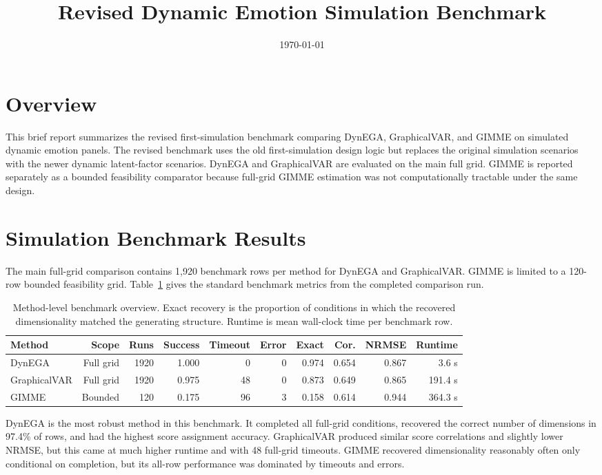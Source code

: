 \documentclass[11pt]{article}
\title{Revised Dynamic Emotion Simulation Benchmark}
\author{}
\date{\today}
\begin{document}
\maketitle

\section{Overview}

This brief report summarizes the revised first-simulation benchmark comparing
DynEGA, GraphicalVAR, and GIMME on simulated dynamic emotion panels. The revised
benchmark uses the old first-simulation design logic but replaces the original
simulation scenarios with the newer dynamic latent-factor scenarios. DynEGA and
GraphicalVAR are evaluated on the main full grid. GIMME is reported separately as
a bounded feasibility comparator because full-grid GIMME estimation was not
computationally tractable under the same design.

\section{Simulation Benchmark Results}

The main full-grid comparison contains 1,920 benchmark rows per method for
DynEGA and GraphicalVAR. GIMME is limited to a 120-row bounded feasibility grid.
Table~\ref{tab:benchmark-overview} gives the standard benchmark metrics from
the completed comparison run.

\begin{table}[H]
\centering
\caption{Method-level benchmark overview. Exact recovery is the proportion of
conditions in which the recovered dimensionality matched the generating
structure. Runtime is mean wall-clock time per benchmark row.}
\label{tab:benchmark-overview}
\small
\begin{tabular}{lrrrrrrrrr}
\toprule
Method & Scope & Runs & Success & Timeout & Error & Exact & Cor. & NRMSE & Runtime \\
\midrule
DynEGA & Full grid & 1920 & 1.000 & 0 & 0 & 0.974 & 0.654 & 0.867 & 3.6 s \\
GraphicalVAR & Full grid & 1920 & 0.975 & 48 & 0 & 0.873 & 0.649 & 0.865 & 191.4 s \\
GIMME & Bounded & 120 & 0.175 & 96 & 3 & 0.158 & 0.614 & 0.944 & 364.3 s \\
\bottomrule
\end{tabular}
\end{table}

DynEGA is the most robust method in this benchmark. It completed all full-grid
conditions, recovered the correct number of dimensions in 97.4\% of rows, and
had the highest score assignment accuracy. GraphicalVAR produced similar score
correlations and slightly lower NRMSE, but this came at much higher runtime and
with 48 full-grid timeouts. GIMME recovered dimensionality reasonably often only
conditional on completion, but its all-row performance was dominated by timeouts
and errors.
\end{document}
